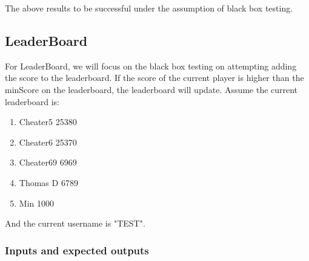 \documentclass[11pt]{article}
\begin{document}
    The above results to be successful under the assumption of black box testing.

    \subsection{LeaderBoard}
    For LeaderBoard, we will focus on the black box testing on attempting adding the score to the leaderboard.
    If the score of the current player is higher than the minScore on the leaderboard, the leaderboard will update.
    Assume the current leaderboard is:
    \begin{enumerate}
        \item Cheater5 25380
        \item Cheater6 25370
        \item Cheater69 6969
        \item Thomas D  6789
        \item Min       1000
    \end{enumerate}
    And the current username is "TEST".

    \subsubsection*{Inputs and expected outputs}
\end{document}
